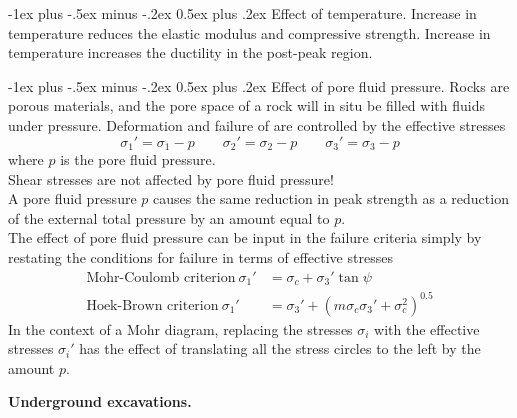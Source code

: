 \documentclass[10pt,landscape,a4paper]{article}
\makeatletter
\newcounter{Chapcounter}
\newcommand{\chapter}[1]{{\addtocounter{Chapcounter}{1}\fontsize{17}{16}\textbf{#1}}}
\renewcommand{\section}{\@startsection{section}{1}{0mm}%
	{-1ex plus -.5ex minus -.2ex}%
	{0.5ex plus .2ex}%
	{\normalfont\large\bfseries}}
\makeatother
\begin{document}
\begin{multicols}{3}
		\section{Effect of temperature.}
		Increase in temperature reduces the elastic modulus and compressive strength.
		Increase in temperature increases the ductility in the post-peak region.
		
		\section{Effect of pore fluid pressure.}
		Rocks are porous materials, and the pore space of a rock will in situ be filled with fluids under pressure.
		Deformation and failure of are controlled by the effective stresses
		\[
			\sigma_1'=\sigma_1-p \qquad \sigma_2'=\sigma_2-p \qquad \sigma_3'=\sigma_3-p
		\]
		where $p$ is the pore fluid pressure.\\
		Shear stresses are not affected by pore fluid pressure!\\
		A pore fluid pressure $p$ causes the same reduction in peak strength as a reduction of the external total pressure by an amount equal to $p$.\\
		The effect of pore fluid pressure can be input in the failure criteria simply by restating the conditions for failure in terms of effective stresses
			\begin{align*}
				\text{Mohr-Coulomb criterion} \ \sigma_1' & =\sigma_c+\sigma_3'\tan\psi\\
				\text{Hoek-Brown criterion} \ \sigma_1' & =\sigma_3'+(m\sigma_c\sigma_3'+\sigma_c^2)^{0.5}
			\end{align*}
		In the context of a Mohr diagram, replacing the stresses $\sigma_i$ with the effective stresses $\sigma_i'$ has the effect of translating all the stress circles to the left by the amount $p$.
		
		\chapter{Underground excavations.}
		

\end{multicols}
\end{document}
